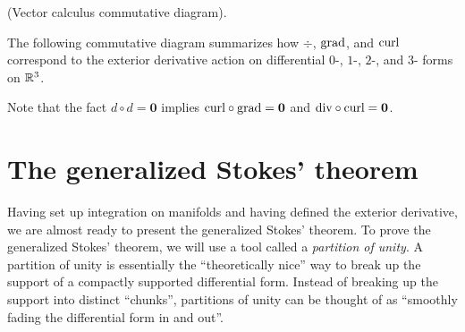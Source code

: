 \begin{theorem}
     (Vector calculus commutative diagram).
    
    The following commutative diagram summarizes how $\div$, $\text{grad}$, and $\text{curl}$ correspond to the exterior derivative action on differential $0$-, $1$-, $2$-, and $3$- forms on $\mathbb{R}^3$.
    
    
    Note that the fact $d \circ d = \mathbf{0}$ implies $\text{curl} \circ \text{grad} = \mathbf{0}$ and $\text{div} \circ \text{curl} = \mathbf{0}$.
\end{theorem}

\newpage

\section{The generalized Stokes' theorem}

Having set up integration on manifolds and having defined the exterior derivative, we are almost ready to present the generalized Stokes' theorem. To prove the generalized Stokes' theorem, we will use a tool called a \textit{partition of unity}. A partition of unity is essentially the ``theoretically nice'' way to break up the support of a compactly supported differential form. Instead of breaking up the support into distinct ``chunks'', partitions of unity can be thought of as  ``smoothly fading the differential form in and out''.

